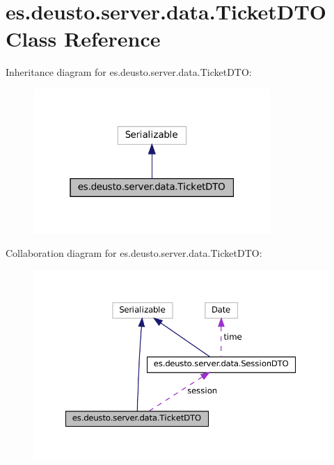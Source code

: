 \hypertarget{classes_1_1deusto_1_1server_1_1data_1_1_ticket_d_t_o}{}\section{es.\+deusto.\+server.\+data.\+Ticket\+D\+TO Class Reference}
\label{classes_1_1deusto_1_1server_1_1data_1_1_ticket_d_t_o}


Inheritance diagram for es.\+deusto.\+server.\+data.\+Ticket\+D\+TO\+:\nopagebreak
\begin{figure}[H]
\begin{center}
\leavevmode
\includegraphics[width=256pt]{classes_1_1deusto_1_1server_1_1data_1_1_ticket_d_t_o__inherit__graph}
\end{center}
\end{figure}


Collaboration diagram for es.\+deusto.\+server.\+data.\+Ticket\+D\+TO\+:\nopagebreak
\begin{figure}[H]
\begin{center}
\leavevmode
\includegraphics[width=350pt]{classes_1_1deusto_1_1server_1_1data_1_1_ticket_d_t_o__coll__graph}
\end{center}
\end{figure}
